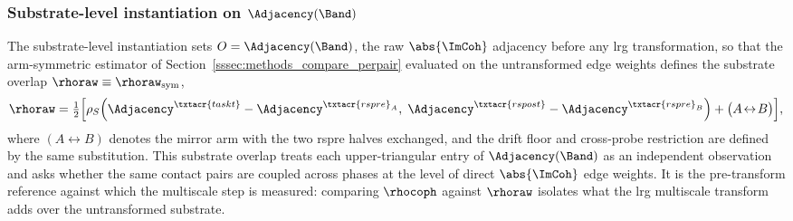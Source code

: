 \subsubsection{Substrate-level instantiation on \texorpdfstring{\(\Adjacency(\Band)\)}{W(B)}}
    \label{sssec:methods_compare_rawfc}
%
The substrate-level instantiation sets \(O = \Adjacency(\Band)\), the raw \(\abs{\ImCoh}\) adjacency before any \gls{lrg} transformation, so that the arm-symmetric estimator of Section~\ref{sssec:methods_compare_perpair} evaluated on the untransformed edge weights defines the substrate overlap \(\rhoraw \equiv \rhoraw_{\mathrm{sym}}\),
\begin{equation}
    \rhoraw = \tfrac{1}{2}\Big[\rho_{S}\!\left(\Adjacency^{\txtacr{taskt}} - \Adjacency^{\txtacr{rspre}_{A}},\; \Adjacency^{\txtacr{rspost}} - \Adjacency^{\txtacr{rspre}_{B}}\right) + \big(A\!\leftrightarrow\!B\big)\Big],
    \label{eq:methods_rho_raw}
\end{equation}
where \((A\!\leftrightarrow\!B)\) denotes the mirror arm with the two \acrshort{rspre} halves exchanged, and the drift floor and cross-probe restriction are defined by the same substitution. This substrate overlap treats each upper-triangular entry of \(\Adjacency(\Band)\) as an independent observation and asks whether the same contact pairs are coupled across phases at the level of direct \(\abs{\ImCoh}\) edge weights. It is the pre-transform reference against which the multiscale step is measured: comparing \(\rhocoph\) against \(\rhoraw\) isolates what the \gls{lrg} multiscale transform adds over the untransformed substrate.
%
